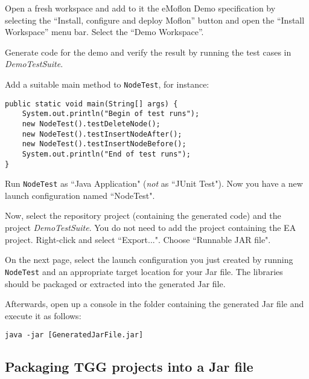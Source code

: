 \begin{stepbystep}
    
\item 
Open a fresh workspace and add to it the eMoflon Demo specification by selecting the ``Install, configure and deploy Moflon'' button and open the  ``Install Workspace'' menu bar. Select the ``Demo Workspace''.
    
\item 
Generate code for the demo and verify the result by running the test cases in \emph{DemoTestSuite}.

\item 
Add a suitable main method to \texttt{NodeTest}, for instance:
\begin{lstlisting}
public static void main(String[] args) {
    System.out.println("Begin of test runs");
    new NodeTest().testDeleteNode();
    new NodeTest().testInsertNodeAfter();
    new NodeTest().testInsertNodeBefore();
    System.out.println("End of test runs");
}
\end{lstlisting}

\item 
Run \texttt{NodeTest} as ``Java Application" (\emph{not} as ``JUnit Test").
Now you have a new launch configuration named ``NodeTest".

\item 
Now, select the repository project (containing the generated code) and the project \emph{DemoTestSuite}.
You do not need to add the project containing the EA project.
Right-click and select ``Export...".
Choose ``Runnable JAR file".
  
\item 
On the next page, select the launch configuration you just created by running \texttt{NodeTest} and an appropriate target location for your Jar file.
The libraries should be packaged or extracted into the generated Jar file.

\item 
Afterwards, open up a console in the folder containing the generated Jar file and execute it as follows:
\begin{lstlisting}
java -jar [GeneratedJarFile.jar]
\end{lstlisting}

    
\end{stepbystep}

\subsection{Packaging TGG projects into a Jar file}

